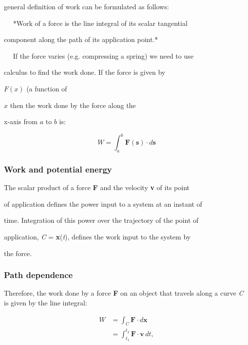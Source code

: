 general definition of work can be formulated as follows:


$\quad$ *Work of a force is the line integral of its scalar tangential

    component along the path of its application point.*


$\quad$ If the force varies (e.g. compressing a spring) we need to use

    calculus to find the work done. If the force is given by

    $F(x)$ (a function of

    $x$ then the work done by the force along the

    x-axis from $a$ to $b$ is:


\[
W = \int _{a}^{b} \mathbf{F(s)} \cdot d\mathbf{s}
\]


\subsubsection{Work and potential energy}
\label{sss:work-305a}


The scalar product of a force \textbf{F} and the velocity \textbf{v} of its point

of application defines the power input to a system at an instant of

time. Integration of this power over the trajectory of the point of

application, \textit{C} = \textbf{x}(\textit{t}), defines the work input to the system by

the force.


\subsubsection{Path dependence}
\label{sss:path-5c74}


Therefore, the work done by a force \textbf{F} on an object that travels along a curve \textit{C} is given by the line integral:


\begin{align}
W &= \int_C \mathbf{F} \cdot d\mathbf{x} \\&=  \int _{t_1}^{t_2}\mathbf{F}\cdot \mathbf{v}\,dt,
\end{align}


